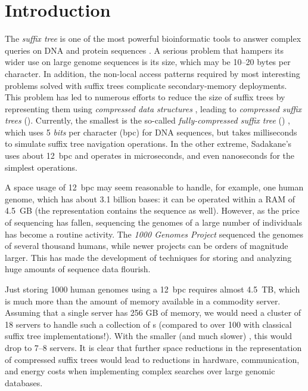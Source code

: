 

\section{Introduction}

The \emph{suffix tree} \cite{Weiner1973} is one of the most powerful bioinformatic tools to
answer complex queries on DNA and protein sequences \cite{Gus97,Ohl13,MBCT15}.
A serious problem that hampers its wider use on large genome sequences is its
size, which may be 10--20 bytes per character. In addition, the non-local
access patterns required by most interesting problems solved with suffix trees
complicate secondary-memory deployments. This problem has led to numerous
efforts to reduce the size of suffix trees by representing them using 
\emph{compressed data structures} \cite{Sadakane2007,Fischer2009a,Ohlebusch2009,Ohlebusch2010,Fis10,Russo2011,Gog2011a,GO13b,Abeliuk2013,Navarro2014a,Navarro2015,Ock15,BCGPR15}, 
leading to \emph{compressed suffix trees} (\CST). Currently, the smallest
\CST{} is the so-called \emph{fully-compressed suffix tree} (\FCST)
\cite{Russo2011,Navarro2014a}, which uses 5 \emph{bits} per character (bpc)
for DNA sequences, but takes milliseconds to simulate suffix
tree navigation operations. In the other extreme, Sadakane's \CST{}
\cite{Sadakane2007,Gog2011a} uses about 12~bpc and operates in
microseconds, and even nanoseconds for the simplest operations.

A space usage of 12~bpc may seem reasonable to handle, for example, one human
genome, which has about 3.1 billion bases: it can be operated within a
RAM of 4.5~GB (the representation contains the sequence as well). However,
as the price of sequencing has fallen, sequencing the genomes of a large
number of individuals has become a routine activity. The \emph{1000 Genomes
Project} \cite{1000GP2015} sequenced the genomes of several thousand humans,
while newer projects can be orders of magnitude larger. This has made the
development of techniques for storing and analyzing huge amounts of sequence
data flourish.

Just storing 1000 human genomes using a 12~bpc \CST{} requires almost 4.5~TB, which
is much more than the amount of memory available in a commodity server. Assuming that
a single server has 256 GB of memory, we would need a cluster of 18 servers to
handle such a collection of \CST{}s (compared to over 100 with classical suffix
tree implementations!). With the smaller (and much slower) \FCST, this would
drop to 7--8 servers. It is clear that further space reductions in the
representation of compressed suffix trees would lead to reductions in hardware, communication,
and energy costs when implementing complex searches over large genomic
databases.

